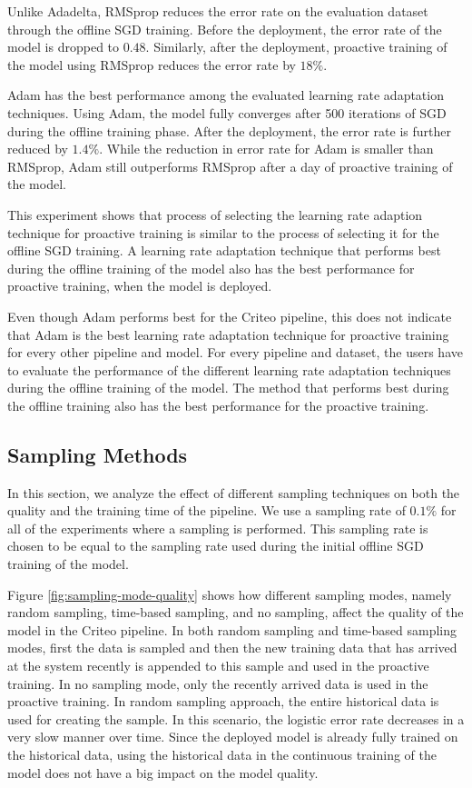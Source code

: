Unlike Adadelta, RMSprop reduces the error rate on the evaluation dataset through the offline SGD training.
Before the deployment, the error rate of the model is dropped to $0.48$.
Similarly, after the deployment, proactive training of the model using RMSprop reduces the error rate by $18\%$.

Adam has the best performance among the evaluated learning rate adaptation techniques.
Using Adam, the model fully converges after 500 iterations of SGD during the offline training phase.
After the deployment, the error rate is further reduced by $1.4\%$.
While the reduction in error rate for Adam is smaller than RMSprop, Adam still outperforms RMSprop after a day of proactive training of the model.

This experiment shows that process of selecting the learning rate adaption technique for proactive training is similar to the process of selecting it for the offline SGD training.
A learning rate adaptation technique that performs best during the offline training of the model also has the best performance for proactive training, when the model is deployed.

Even though Adam performs best for the Criteo pipeline, this does not indicate that Adam is the best learning rate adaptation technique for proactive training for every other pipeline and model.
For every pipeline and dataset, the users have to evaluate the performance of the different learning rate adaptation techniques during the offline training of the model.
The method that performs best during the offline training also has the best performance for the proactive training.

\subsection{Sampling Methods}
In this section, we analyze the effect of different sampling techniques on both the quality and the training time of the pipeline.
We use a sampling rate of $0.1\%$ for all of the experiments where a sampling is performed.
This sampling rate is chosen to be equal to the sampling rate used during the initial offline SGD training of the model.

Figure \ref{fig:sampling-mode-quality} shows how different sampling modes, namely random sampling, time-based sampling, and no sampling, affect the quality of the model in the Criteo pipeline.
In both random sampling and time-based sampling modes, first the data is sampled and then the new training data that has arrived at the system recently is appended to this sample and used in the proactive training.
In no sampling mode, only the recently arrived data is used in the proactive training.
In random sampling approach, the entire historical data is used for creating the sample.
In this scenario, the logistic error rate decreases in a very slow manner over time.
Since the deployed model is already fully trained on the historical data, using the historical data in the continuous training of the model does not have a big impact on the model quality.

